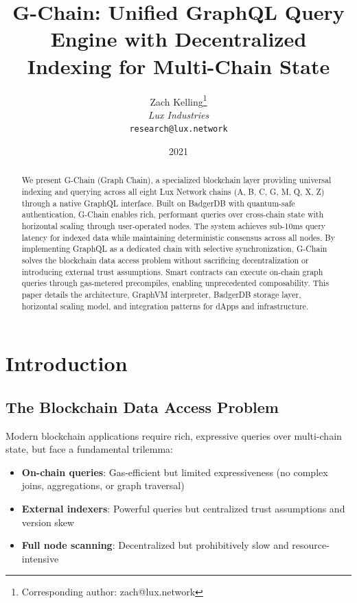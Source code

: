 \documentclass[11pt,a4paper]{article}
\title{G-Chain: Unified GraphQL Query Engine with Decentralized Indexing for Multi-Chain State}
\author{
Zach Kelling\thanks{Corresponding author: zach@lux.network}\\
\textit{Lux Industries}\\
\texttt{research@lux.network}
}
\date{2021}
\begin{document}
\luxcoverpage
\maketitle
\begin{abstract}
We present G-Chain (Graph Chain), a specialized blockchain layer providing universal indexing and querying across all eight Lux Network chains (A, B, C, G, M, Q, X, Z) through a native GraphQL interface. Built on BadgerDB with quantum-safe authentication, G-Chain enables rich, performant queries over cross-chain state with horizontal scaling through user-operated nodes. The system achieves sub-10ms query latency for indexed data while maintaining deterministic consensus across all nodes. By implementing GraphQL as a dedicated chain with selective synchronization, G-Chain solves the blockchain data access problem without sacrificing decentralization or introducing external trust assumptions. Smart contracts can execute on-chain graph queries through gas-metered precompiles, enabling unprecedented composability. This paper details the architecture, GraphVM interpreter, BadgerDB storage layer, horizontal scaling model, and integration patterns for dApps and infrastructure.
\end{abstract}


\luxcoverpage
\maketitle

\section{Introduction}

\subsection{The Blockchain Data Access Problem}

Modern blockchain applications require rich, expressive queries over multi-chain state, but face a fundamental trilemma:

\begin{itemize}
\item \textbf{On-chain queries}: Gas-efficient but limited expressiveness (no complex joins, aggregations, or graph traversal)
\item \textbf{External indexers}: Powerful queries but centralized trust assumptions and version skew
\item \textbf{Full node scanning}: Decentralized but prohibitively slow and resource-intensive
\end{itemize}
\end{document}
